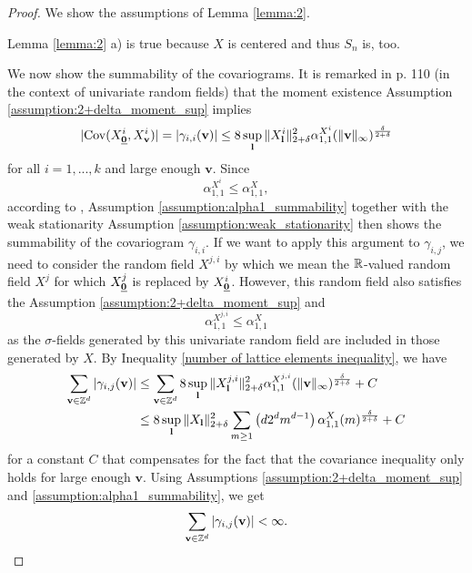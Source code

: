\begin{proof}
    We show the assumptions of Lemma \ref{lemma:2}. 
    
    \noindent Lemma \ref{lemma:2} a) is true because $X$ is centered and thus $S_n$ is, too.

    We now show the summability of the covariograms.
    It is remarked in \cite{[23]guyon1995random} p. 110 (in the context of univariate random fields) that the moment existence Assumption \ref{assumption:2+delta_moment_sup} implies
    \begin{equation*}
        |\Cov(X^i_{\usbf[0]}, X^i_{\mathbf{v}})| = |\gamma_{i, i}(\mathbf{v})| \leq 8 \sup\limits_{\mathbf{l}} \|X_\mathbf{l}^i\|_{2+\delta}^2 \alpha_{1, 1}^{X^i}(\|\mathbf{v}\|_\infty)^{\frac{\delta}{2+\delta}}
    \end{equation*}
    for all $i = 1, ..., k$ and large enough $\mathbf{v}$. 
    Since 
    \[ \alpha_{1, 1}^{X^i} \leq \alpha_{1, 1}^{X}, \] 
    according to \cite{[23]guyon1995random}, Assumption \ref{assumption:alpha1_summability} together with the weak stationarity Assumption \ref{assumption:weak_stationarity} then shows the summability of the covariogram $\gamma_{i, i}$.
    If we want to apply this argument to $\gamma_{i, j}$, we need to consider the random field $X^{j, i}$ by which we mean the $\mathbb{R}$-valued random field $X^j$ for which $X_{\usbf[0]}^j$ is replaced by $X_{\usbf[0]}^i$. However, this random field also satisfies the Assumption \ref{assumption:2+delta_moment_sup} and
    \[ \alpha_{1, 1}^{X^{j, i}} \leq \alpha_{1, 1}^{X} \]
    as the $\sigma$-fields generated by this univariate random field are included in those generated by $X$.
    By Inequality \eqref{number of lattice elements inequality}, we have
    \begin{align*}
        \sum\limits_{\mathbf{v} \in \mathbb{Z}^d} |\gamma_{i, j}(\mathbf{v}) |
        & \leq \sum\limits_{\mathbf{v} \in \mathbb{Z}^d} 8 \sup\limits_{\mathbf{l}} \| X_{\mathbf{l}}^{j, i} \|_{2+\delta}^2 \alpha_{1, 1}^{X^{j, i}}(\|\mathbf{v}\|_\infty)^{\frac{\delta}{2+\delta}} + C \\
        & \leq 8 \sup\limits_{\mathbf{l}} \| X_{\mathbf{l}} \|_{2+\delta}^2 \sum\limits_{m \geq 1} \left( d 2^d m^{d-1} \right) \alpha_{1, 1}^{X}(m)^{\frac{\delta}{2+\delta}} + C
    \end{align*}
    for a constant $C$ that compensates for the fact that the covariance inequality only holds for large enough $\mathbf{v}$. Using Assumptions \ref{assumption:2+delta_moment_sup} and \ref{assumption:alpha1_summability}, we get
    \begin{equation} \label{lemma3:summierbarkeit gamma}
        \sum\limits_{\mathbf{v} \in \mathbb{Z}^d} |\gamma_{i, j}(\mathbf{v})| < \infty.
    \end{equation}


\end{proof}
